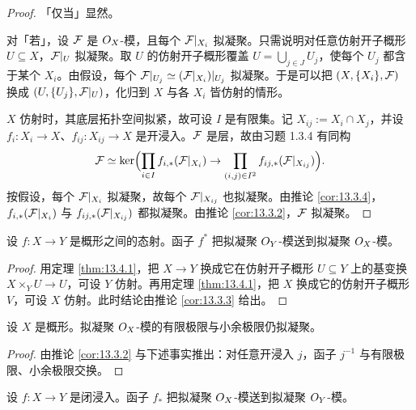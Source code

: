 \begin{proof}
「仅当」显然。

对「若」，设 $\mathcal{F}$ 是 $O_X$-模，且每个 $\mathcal{F}|_{X_i}$ 拟凝聚。只需说明对任意仿射开子概形 $U\subseteq X$，$\mathcal{F}|_U$ 拟凝聚。取 $U$ 的仿射开子概形覆盖 $U=\bigcup_{j\in J}U_j$，使每个 $U_j$ 都含于某个 $X_i$。由假设，每个 $\mathcal{F}|_{U_j}\simeq(\mathcal{F}|_{X_i})|_{U_j}$ 拟凝聚。于是可以把 $(X,\{X_i\},\mathcal{F})$ 换成 $(U,\{U_j\},\mathcal{F}|_U)$，化归到 $X$ 与各 $X_i$ 皆仿射的情形。

$X$ 仿射时，其底层拓扑空间拟紧，故可设 $I$ 是有限集。记 $X_{ij}:=X_i\cap X_j$，并设 $f_i\colon X_i\to X$、$f_{ij}\colon X_{ij}\to X$ 是开浸入。$\mathcal{F}$ 是层，故由习题 1.3.4 有同构
\[
\mathcal{F}\simeq\ker\Bigl(\prod_{i\in I}f_{i,*}(\mathcal{F}|_{X_i})\to\prod_{(i,j)\in I^2}f_{ij,*}(\mathcal{F}|_{X_{ij}})\Bigr).
\]
按假设，每个 $\mathcal{F}|_{X_i}$ 拟凝聚，故每个 $\mathcal{F}|_{X_{ij}}$ 也拟凝聚。由推论 \ref{cor:13.3.4}，$f_{i,*}(\mathcal{F}|_{X_i})$ 与 $f_{ij,*}(\mathcal{F}|_{X_{ij}})$ 都拟凝聚。由推论 \ref{cor:13.3.2}，$\mathcal{F}$ 拟凝聚。
\end{proof}

\begin{corollary}\label{cor:13.4.2}
设 $f\colon X\to Y$ 是概形之间的态射。函子 $f^*$ 把拟凝聚 $O_Y$-模送到拟凝聚 $O_X$-模。
\end{corollary}

\begin{proof}
用定理 \ref{thm:13.4.1}，把 $X\to Y$ 换成它在仿射开子概形 $U\subseteq Y$ 上的基变换 $X\times_YU\to U$，可设 $Y$ 仿射。再用定理 \ref{thm:13.4.1}，把 $X$ 换成它的仿射开子概形 $V$，可设 $X$ 仿射。此时结论由推论 \ref{cor:13.3.3} 给出。
\end{proof}

\begin{corollary}\label{cor:13.4.3}
设 $X$ 是概形。拟凝聚 $O_X$-模的有限极限与小余极限仍拟凝聚。
\end{corollary}

\begin{proof}
由推论 \ref{cor:13.3.2} 与下述事实推出：对任意开浸入 $j$，函子 $j^{-1}$ 与有限极限、小余极限交换。
\end{proof}

\begin{lemma}\label{lem:13.4.4}
设 $f\colon X\to Y$ 是闭浸入。函子 $f_*$ 把拟凝聚 $O_X$-模送到拟凝聚 $O_Y$-模。
\end{lemma}

